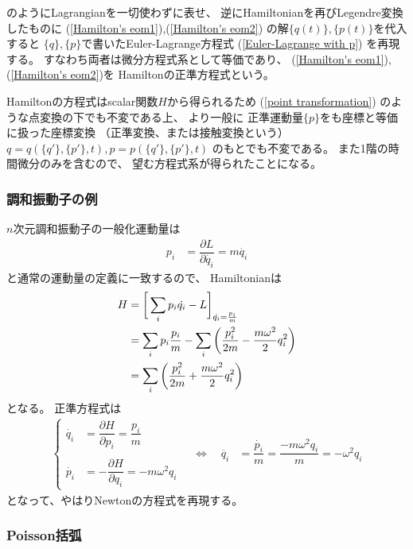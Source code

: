 のようにLagrangianを一切使わずに表せ、
逆にHamiltonianを再びLegendre変換したものに
(\ref{Hamilton's eom1}),(\ref{Hamilton's eom2})
の解$\{q(t)\},\{p(t)\}$を代入すると
$\{q\},\{p\}$で書いたEuler-Lagrange方程式
(\ref{Euler-Lagrange with p})
を再現する。
すなわち両者は微分方程式系として等価であり、
(\ref{Hamilton's eom1}),
(\ref{Hamilton's eom2})を
Hamiltonの正準方程式という。

Hamiltonの方程式はscalar関数$H$から得られるため
(\ref{point transformation})
のような点変換の下でも不変である上、
より一般に
正準運動量$\{p\}$をも座標と等価に扱った座標変換
（正準変換、または接触変換という）
$q = q(\{q'\}, \{p'\}, t ) ,
p = p(\{q'\}, \{p'\}, t )
$
のもとでも不変である。
また1階の時間微分のみを含むので、
望む方程式系が得られたことになる。

\subsubsection{調和振動子の例}

$n$次元調和振動子の一般化運動量は
\begin{align}
  p_i &= \dfrac{\partial L}{\partial \dot{q_i}}
=
  m \dot{q_i}
\end{align}
と通常の運動量の定義に一致するので、
Hamiltonianは
\begin{align}
  H &= \bigg[
    \sum_i p_i \dot{q_i}
    - L
    \bigg]_{ \dot{q_i} = \frac{p_i}{m} }
\notag\\&=
    \sum_i p_i \frac{p_i}{m}
    -
      \sum_i \bigg(
      \dfrac{p_i^2}{2m}
    -
      \dfrac{ m \omega^2 }{2}
      q_i^2
    \bigg)
\notag\\&=
    \sum_i \bigg(
      \dfrac{p_i^2}{2m}
    +
      \dfrac{ m \omega^2 }{2}
      q_i^2
    \bigg)
\end{align}
となる。
正準方程式は
\begin{align}
  \begin{cases}
    \dot{q_i} &= \dfrac{\partial H}{\partial p_i}
    = \dfrac{p_i}{m}
  \\
  \\
    \dot{p_i} &= - \dfrac{\partial H}{\partial q_i}
    = - m \omega^2 q_i
  \end{cases}
\quad
\Leftrightarrow
\quad
  \ddot{q_i} &= \dfrac{\dot{p_i}}{m}
  = \dfrac{- m \omega^2 q_i}{m}
  = - \omega^2 q_i
\label{hamiltonian e.o.m for harmonic oscillator}
\end{align}
となって、やはりNewtonの方程式を再現する。

\subsubsection{Poisson括弧}

